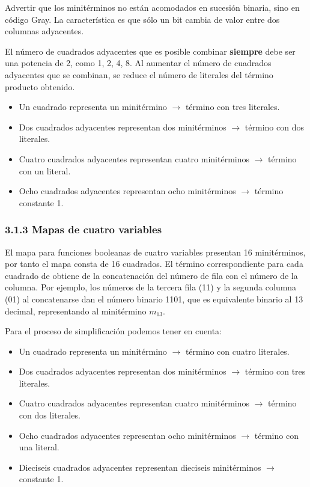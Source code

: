 Advertir que los minit\'{e}rminos no est\'{a}n acomodados en sucesi\'{o}n binaria, sino en
c\'{o}digo Gray. La caracter\'{i}stica es que s\'{o}lo un bit cambia de valor
entre dos columnas adyacentes.

El n\'{u}mero de cuadrados adyacentes que es posible combinar \textbf{siempre}
debe ser una potencia de 2, como 1, 2, 4, 8. Al aumentar el n\'{u}mero de
cuadrados adyacentes que se combinan, se reduce el n\'{u}mero de literales del
t\'{e}rmino producto obtenido.
\begin{itemize}
    \item Un cuadrado representa un minit\'{e}rmino $\rightarrow$ t\'{e}rmino con tres literales.
    \item Dos cuadrados adyacentes representan dos minit\'{e}rminos $\rightarrow$ t\'{e}rmino con dos literales.
    \item Cuatro cuadrados adyacentes representan cuatro minit\'{e}rminos $\rightarrow$ t\'{e}rmino con un literal.
    \item Ocho cuadrados adyacentes representan ocho minit\'{e}rminos $\rightarrow$ t\'{e}rmino constante 1.
\end{itemize}

\subsubsection*{3.1.3 Mapas de cuatro variables}
El mapa para funciones booleanas de cuatro variables presentan 16 minit\'{e}rminos,
por tanto el mapa consta de 16 cuadrados. El t\'{e}rmino correspondiente para cada
cuadrado de obtiene de la concatenaci\'{o}n del n\'{u}mero de fila con el n\'{u}mero
de la columna. Por ejemplo, los n\'{u}meros de la tercera fila (11) y la segunda
columna (01) al concatenarse dan el n\'{u}mero binario 1101, que es equivalente
binario al 13 decimal, representando al minit\'{e}rmino $m_{13}$.

Para el proceso de simplificaci\'{o}n podemos tener en cuenta:
\begin{itemize}
    \item Un cuadrado representa un minit\'{e}rmino $\rightarrow$ t\'{e}rmino con cuatro literales.
    \item Dos cuadrados adyacentes representan dos minit\'{e}rminos $\rightarrow$ t\'{e}rmino con tres literales.
    \item Cuatro cuadrados adyacentes representan cuatro minit\'{e}rminos $\rightarrow$ t\'{e}rmino con dos literales.
    \item Ocho cuadrados adyacentes representan ocho minit\'{e}rminos $\rightarrow$ t\'{e}rmino con una literal.
    \item Dieciseis cuadrados adyacentes representan dieciseis minit\'{e}rminos $\rightarrow$ constante 1.
\end{itemize}

